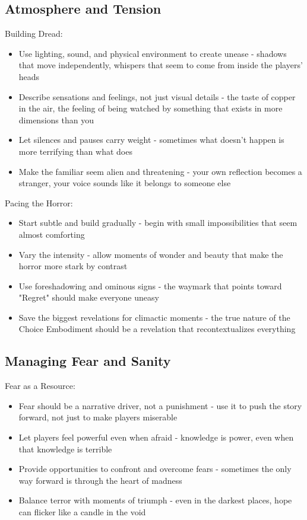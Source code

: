 \documentclass[11pt]{article}
\begin{document}
\subsection{Atmosphere and Tension}

Building Dread:
\begin{itemize}
\item Use lighting, sound, and physical environment to create unease - shadows that move independently, whispers that seem to come from inside the players' heads
\item Describe sensations and feelings, not just visual details - the taste of copper in the air, the feeling of being watched by something that exists in more dimensions than you
\item Let silences and pauses carry weight - sometimes what doesn't happen is more terrifying than what does
\item Make the familiar seem alien and threatening - your own reflection becomes a stranger, your voice sounds like it belongs to someone else
\end{itemize}

Pacing the Horror:
\begin{itemize}
\item Start subtle and build gradually - begin with small impossibilities that seem almost comforting
\item Vary the intensity - allow moments of wonder and beauty that make the horror more stark by contrast
\item Use foreshadowing and ominous signs - the waymark that points toward "Regret" should make everyone uneasy
\item Save the biggest revelations for climactic moments - the true nature of the Choice Embodiment should be a revelation that recontextualizes everything
\end{itemize}

\subsection{Managing Fear and Sanity}

Fear as a Resource:
\begin{itemize}
\item Fear should be a narrative driver, not a punishment - use it to push the story forward, not just to make players miserable
\item Let players feel powerful even when afraid - knowledge is power, even when that knowledge is terrible
\item Provide opportunities to confront and overcome fears - sometimes the only way forward is through the heart of madness
\item Balance terror with moments of triumph - even in the darkest places, hope can flicker like a candle in the void
\end{itemize}
\end{document}

